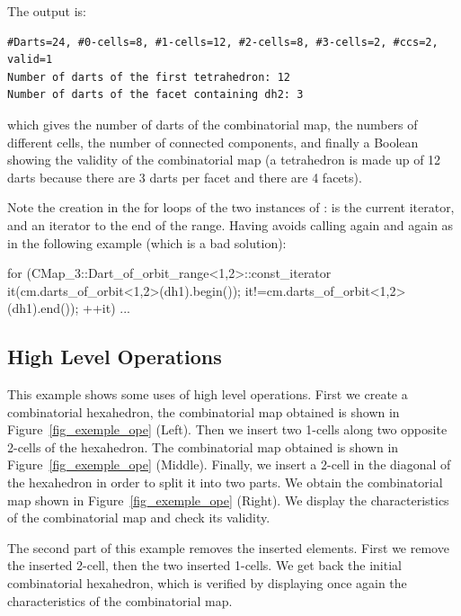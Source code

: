 
The output is:
\begin{verbatim}
#Darts=24, #0-cells=8, #1-cells=12, #2-cells=8, #3-cells=2, #ccs=2, valid=1
Number of darts of the first tetrahedron: 12
Number of darts of the facet containing dh2: 3
\end{verbatim}

which gives the number of darts of the combinatorial map, the numbers
of different cells, the number of connected components, and finally a
Boolean showing the validity of the combinatorial map (a tetrahedron
is made up of 12 darts because there are 3 darts per facet and there
are 4 facets).

Note the creation in the for loops of the two instances of
:  is the current iterator,
and  an iterator to the end of the range. Having
 avoids calling 
again and again as in the following example (which is a bad
solution):
\begin{ccExampleCode}
  for (CMap_3::Dart_of_orbit_range<1,2>::const_iterator 
       it(cm.darts_of_orbit<1,2>(dh1).begin());
       it!=cm.darts_of_orbit<1,2>(dh1).end()); ++it)
  {...}
\end{ccExampleCode}

\subsection{High Level Operations}
\label{ssec-exemple-operations}
This example shows some uses of high level operations.  First we
create a combinatorial hexahedron, the combinatorial map obtained is shown in
Figure~\ref{fig_exemple_ope} (Left). Then we insert two 1-cells along
two opposite 2-cells of the hexahedron. The combinatorial map
obtained is shown in Figure~\ref{fig_exemple_ope} (Middle).  Finally, we
insert a 2-cell in the diagonal of the hexahedron in order to split
it into two parts. We obtain the combinatorial map shown in
Figure~\ref{fig_exemple_ope} (Right). We display the characteristics
of the combinatorial map and check its validity.

The second part of this example removes the inserted elements. First
we remove the inserted 2-cell, then the two inserted 1-cells. We get
back the initial combinatorial hexahedron, which is verified by displaying once
again the characteristics of the combinatorial map.

